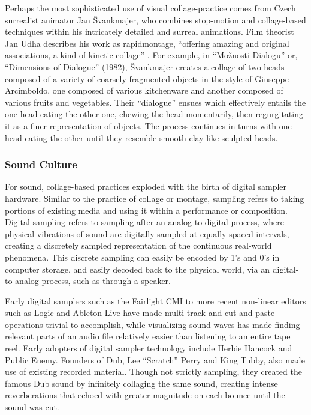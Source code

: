 \documentclass[a4paper,11pt,final]{ThesisStyle}
\begin{document}
Perhaps the most sophisticated use of visual collage-practice comes from Czech surrealist animator Jan {\v S}vankmajer, who combines stop-motion and collage-based techniques within his intricately detailed and surreal animations.  Film theorist Jan Udha describes his work as rapidmontage, ``offering amazing and original associations, a kind of kinetic collage'' \cite{Uhde}.  For example, in ``Mo{\v z}nosti Dialogu'' or, ``Dimensions of Dialogue'' (1982), {\v S}vankmajer creates a collage of two heads composed of a variety of coarsely fragmented objects in the style of Giuseppe Arcimboldo, one composed of various kitchenware and another composed of various fruits and vegetables.  Their ``dialogue'' ensues which effectively entails the one head eating the other one, chewing the head momentarily, then regurgitating it as a finer representation of objects.  The process continues in turns with one head eating the other until they resemble smooth clay-like sculpted heads.  

\subsubsection{Sound Culture}
For sound, collage-based practices exploded with the birth of digital sampler hardware.  Similar to the practice of collage or montage, sampling refers to taking portions of existing media and using it within a performance or composition.  Digital sampling refers to sampling after an analog-to-digital process, where physical vibrations of sound are digitally sampled at equally spaced intervals, creating a discretely sampled representation of the continuous real-world phenomena.  This discrete sampling can easily be encoded by 1's and 0's in computer storage, and easily decoded back to the physical world, via an digital-to-analog process, such as through a speaker.  

Early digital samplers such as the Fairlight CMI to more recent non-linear editors such as Logic and Ableton Live have made multi-track and cut-and-paste operations trivial to accomplish, while visualizing sound waves has made finding relevant parts of an audio file relatively easier than listening to an entire tape reel.  Early adopters of digital sampler technology include Herbie Hancock and Public Enemy.  Founders of Dub, Lee ``Scratch'' Perry and King Tubby, also made use of existing recorded material.  Though not strictly sampling, they created the famous Dub sound by infinitely collaging the same sound, creating intense reverberations that echoed with greater magnitude on each bounce until the sound was cut.  
\end{document}
